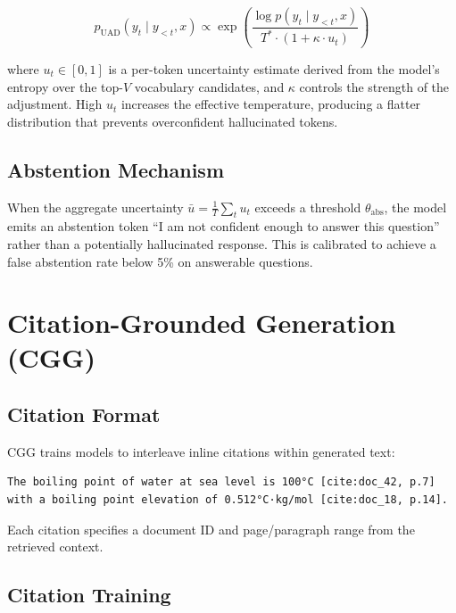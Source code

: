 \documentclass[11pt,a4paper]{article}
\begin{document}
\begin{equation}
    p_{\text{UAD}}(y_t \mid y_{<t}, x) \propto
    \exp\!\left(\frac{\log p(y_t \mid y_{<t}, x)}{T^* \cdot (1 + \kappa \cdot u_t)}\right)
    \label{eq:uad}
\end{equation}

where $u_t \in [0,1]$ is a per-token uncertainty estimate derived from the model's
entropy over the top-$V$ vocabulary candidates, and $\kappa$ controls the strength of
the adjustment. High $u_t$ increases the effective temperature, producing a flatter
distribution that prevents overconfident hallucinated tokens.

\subsection{Abstention Mechanism}

When the aggregate uncertainty $\bar{u} = \frac{1}{T}\sum_t u_t$ exceeds a threshold
$\theta_{\text{abs}}$, the model emits an abstention token ``I am not confident enough
to answer this question'' rather than a potentially hallucinated response. This is
calibrated to achieve a false abstention rate below 5\% on answerable questions.

\section{Citation-Grounded Generation (CGG)}
\label{sec:cgg}

\subsection{Citation Format}

CGG trains models to interleave inline citations within generated text:
\begin{verbatim}
The boiling point of water at sea level is 100°C [cite:doc_42, p.7]
with a boiling point elevation of 0.512°C·kg/mol [cite:doc_18, p.14].
\end{verbatim}

Each citation specifies a document ID and page/paragraph range from the retrieved context.

\subsection{Citation Training}
\end{document}

